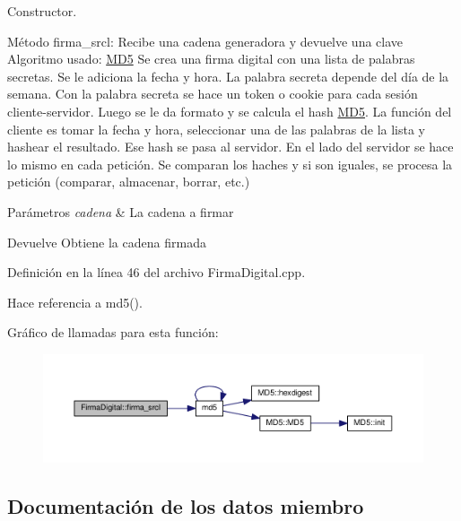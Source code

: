 Constructor. 

Método firma\+\_\+srcl\+: Recibe una cadena generadora y devuelve una clave Algoritmo usado\+: \hyperlink{classMD5}{M\+D5} Se crea una firma digital con una lista de palabras secretas. Se le adiciona la fecha y hora. La palabra secreta depende del día de la semana. Con la palabra secreta se hace un token o cookie para cada sesión cliente-\/servidor. Luego se le da formato y se calcula el hash \hyperlink{classMD5}{M\+D5}. La función del cliente es tomar la fecha y hora, seleccionar una de las palabras de la lista y hashear el resultado. Ese hash se pasa al servidor. En el lado del servidor se hace lo mismo en cada petición. Se comparan los haches y si son iguales, se procesa la petición (comparar, almacenar, borrar, etc.)


\begin{DoxyParams}{Parámetros}
{\em cadena} & La cadena a firmar \\
\hline
\end{DoxyParams}
\begin{DoxyReturn}{Devuelve}
Obtiene la cadena firmada 
\end{DoxyReturn}


Definición en la línea 46 del archivo Firma\+Digital.\+cpp.



Hace referencia a md5().

Gráfico de llamadas para esta función\+:\nopagebreak
\begin{figure}[H]
\begin{center}
\leavevmode
\includegraphics[width=350pt]{classFirmaDigital_ac68550394f9f4e0b73e80dc050875325_cgraph}
\end{center}
\end{figure}


\subsection{Documentación de los datos miembro}
\hypertarget{classFirmaDigital_a912b493f793c1e2ca268b534e65a65a0}{}\label{classFirmaDigital_a912b493f793c1e2ca268b534e65a65a0} 
